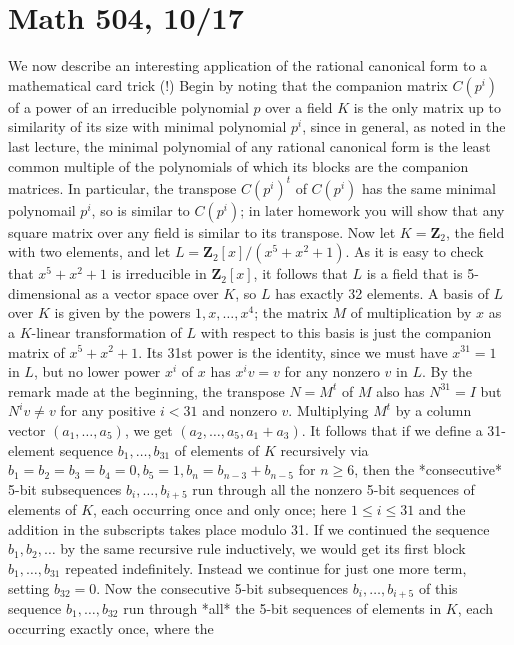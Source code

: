 \documentclass[10pt]{article}
\begin{document}
\section*{Math 504, 10/17}

We now describe an interesting application of the rational canonical
form to a mathematical card trick (!) Begin by noting that the companion
matrix $C(p^i)$ of a power of an irreducible polynomial $p$ over a field
$K$ is the only matrix up to similarity of its size with minimal
polynomial $p^i$, since in general, as noted in the last lecture, the
minimal polynomial of any rational canonical form is the least common
multiple of the polynomials of which its blocks are the companion
matrices. In particular, the transpose $C(p^i)^t$ of $C(p^i)$ has the
same minimal polynomail $p^i$, so is similar to $C(p^i)$; in later
homework you will show that any square matrix over any field is similar
to its transpose. Now let $K=\mathbf{Z}_2$, the field with two elements,
and let $L=\mathbf{Z}_2[x]/(x^5 + x^2 + 1)$. As it is easy to check that
$x^5 + x^2 + 1$ is irreducible in $\mathbf{Z}_2[x]$, it follows that $L$
is a field that is 5-dimensional as a vector space over $K$, so $L$ has
exactly 32 elements. A basis of $L$ over $K$ is given by the powers
$1,x,\ldots,x^4$; the matrix $M$ of multiplication by $x$ as a
$K$-linear transformation of $L$ with respect to this basis is just the
companion matrix of $x^5 + x^2 + 1$. Its 31st power is the identity,
since we must have $x^31 = 1$ in $L$, but no lower power $x^i$ of $x$
has $x^i v = v$ for any nonzero $v$ in $L$. By the remark made at the
beginning, the transpose $N=M^t$ of $M$ also has $N^{31} = I$ but $N^i
v\ne v$ for any positive $i<31$ and nonzero $v$. Multiplying $M^t$ by a
column vector $(a_1,\ldots,a_5)$, we get $(a_2,\ldots,a_5,a_1 + a_3)$.
It follows that if we define a 31-element sequence $b_1,\ldots,b_{31}$
of elements of $K$ recursively via $b_1=b_2=b_3=b_4=0, b_5=1, b_n =
b_{n-3}+b_{n-5}$ for $n\ge6$, then the *consecutive* 5-bit subsequences
$b_i,\ldots,b_{i+5}$ run through all the nonzero 5-bit sequences of
elements of $K$, each occurring once and only once; here $1\le i\le 31$
and the addition in the subscripts takes place modulo 31. If we
continued the sequence $b_1,b_2,\ldots$ by the same recursive rule
inductively, we would get its first block $b_1,\ldots,b_{31}$ repeated
indefinitely. Instead we continue for just one more term, setting
$b_{32}= 0$. Now the consecutive 5-bit subsequences $b_i,\ldots,b_{i+5}$
of this sequence $b_1,\ldots,b_{32}$ run through *all* the 5-bit
sequences of elements in $K$, each occurring exactly once, where the
\end{document}

